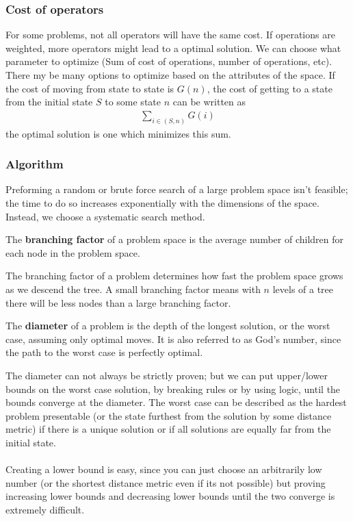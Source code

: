 \documentclass{chezarticle}
\begin{document}
\subsubsection{Cost of operators}
For some problems, not all operators will have the same cost. If operations are weighted, more operators might lead to a optimal solution. We can choose what parameter to optimize (Sum of cost of operations, number of operations, etc). There my be many options to optimize based on the attributes of the space. If the cost of moving from state to state is $G(n)$, the cost of getting to a state from the initial state $S$ to some state $n$ can be written as
\begin{align*}
    \sum_{i \in (S,n)} G(i)
\end{align*}
the optimal solution is one which minimizes this sum.
\subsubsection{Algorithm}
Preforming a random or brute force search of a large problem space isn't feasible; the time to do so increases exponentially with the dimensions of the space. Instead, we choose a systematic search method. 
\begin{definition}
The \textbf{branching factor} of a problem space is the average number of children for each node in the problem space.
\end{definition}
The branching factor of a problem determines how fast the problem space grows as we descend the tree. A small branching factor means with $n$ levels of a tree there will be less nodes than a large branching factor.
\begin{definition}
The \textbf{diameter} of a problem is the depth of the longest solution, or the worst case, assuming only optimal moves. It is also referred to as God's number, since the path to the worst case is perfectly optimal.
\end{definition}
The diameter can not always be strictly proven; but we can put upper/lower bounds on the worst case solution, by breaking rules or by using logic, until the bounds converge at the diameter. The worst case can be described as the hardest problem presentable (or the state furthest from the solution by some distance metric) if there is a unique solution or if all solutions are equally far from the initial state.
\\
\\
Creating a lower bound is easy, since you can just choose an arbitrarily low number (or the shortest distance metric even if its not possible) but proving increasing lower bounds and decreasing lower bounds until the two converge is extremely difficult. 
\end{document}
